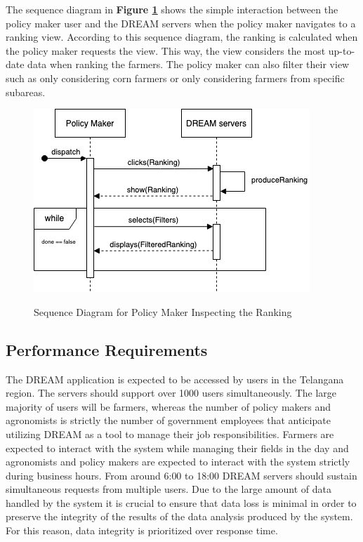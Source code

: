 \begin{flushleft}
The sequence diagram in \textbf{Figure \ref{fig:policySeqViewRank}} shows the simple interaction between the policy maker user and the DREAM servers when the policy maker navigates to a ranking view. According to this sequence diagram, the ranking is calculated when the policy maker requests the view. This way, the view considers the most up-to-date data when ranking the farmers. The policy maker can also filter their view such as only considering corn farmers or only considering farmers from specific subareas.
\end{flushleft}

\begin{figure}[hbt!]
\centering
\includegraphics[scale=0.6]{Files/sequence_disgrams/thePNGs/policy_viewRanking.png}\\
\caption{\label{fig:policySeqViewRank}Sequence Diagram for Policy Maker Inspecting the Ranking}
\end{figure}



\newpage
\subsection{Performance Requirements}

\begin{flushleft}

The DREAM application is expected to be accessed by users in the Telangana region. The servers should support over 1000 users simultaneously. The large majority of users will be farmers, whereas the number of policy makers and agronomists is strictly the number of government employees that anticipate utilizing DREAM as a tool to manage their job responsibilities. Farmers are expected to interact with the system while managing their fields in the day and agronomists and policy makers are expected to interact with the system strictly during business hours. From around 6:00 to 18:00 DREAM servers should sustain simultaneous requests from multiple users. Due to the large amount of data handled by the system it is crucial to ensure that data loss is minimal in order to preserve the integrity of the results of the data analysis produced by the system. For this reason, data integrity is prioritized over response time.\\
\end{flushleft}

